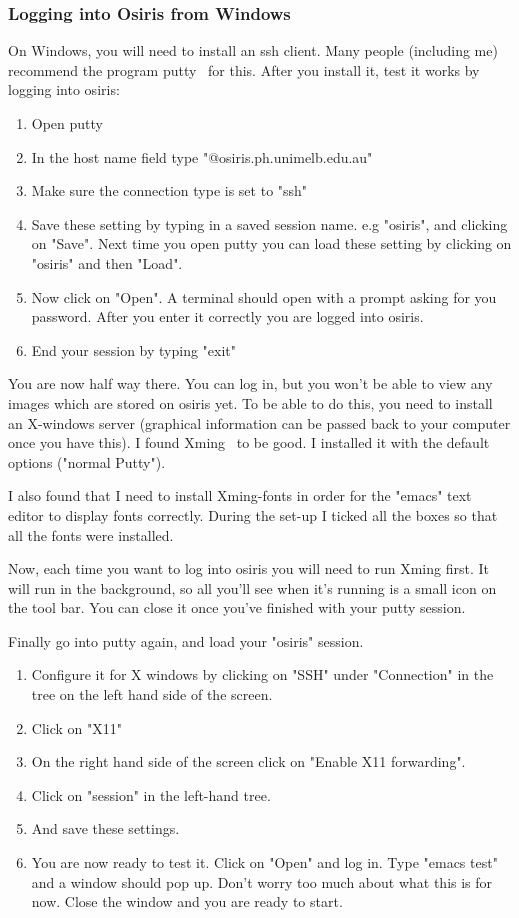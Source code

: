 \documentclass[]{cxs-software}
\begin{document}
\subsubsection{Logging into Osiris from Windows}

On Windows, you will need to install an ssh client. Many people
(including me) recommend the program putty~\cite{} for this.  After
you install it, test it works by logging into osiris:
\begin{enumerate}
\item Open putty 
\item In the host name field type "@osiris.ph.unimelb.edu.au" 
\item Make sure the connection type is set to "ssh" 
\item Save these setting by typing in a saved session name. e.g
  "osiris", and clicking on "Save". Next time you open putty you can load
  these setting by clicking on "osiris" and then "Load".
\item Now click on "Open". A terminal should open with a prompt asking
  for you password. After you enter it correctly you are logged into
  osiris.
\item End your session by typing "exit"
\end{enumerate}

You are now half way there. You can log in, but you won't be able to
view any images which are stored on osiris yet. To be able to do this,
you need to install an X-windows server (graphical information can be
passed back to your computer once you have this). I found
Xming~\cite{} to be good. I installed it with the default options
("normal Putty").

I also found that I need to install Xming-fonts in order for the
"emacs" text editor to display fonts correctly. During the set-up I
ticked all the boxes so that all the fonts were installed.

Now, each time you want to log into osiris you will need to run Xming
first. It will run in the background, so all you'll see when it's
running is a small icon on the tool bar. You can close it once you've
finished with your putty session.

Finally go into putty again, and load your "osiris" session. 
\begin{enumerate}
\item Configure it for X windows by clicking on "SSH" under "Connection" in the tree on the left hand side of the screen. 
\item Click on "X11" 
\item On the right hand side of the screen click on "Enable X11 forwarding". 
\item Click on "session" in the left-hand tree. 
\item And save these settings. 
\item You are now ready to test it. Click on "Open" and log in. Type
  "emacs test" and a window should pop up. Don't worry too much about
  what this is for now. Close the window and you are ready to start.
\end{enumerate}
\end{document}
